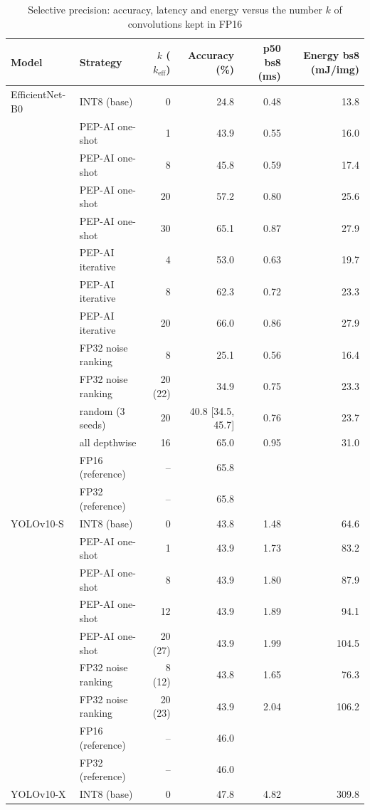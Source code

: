 \documentclass[pdflatex,sn-mathphys-num]{sn-jnl}%
\theoremstyle{thmstyleone}%
\theoremstyle{thmstyletwo}%
\theoremstyle{thmstylethree}%
\begin{document}
\begin{appendices}
\begin{table}[htbp]
\footnotesize\setlength{\tabcolsep}{2.5pt}
\caption{Selective precision: accuracy, latency and energy versus the number $k$ of convolutions kept in FP16}\label{tab:selective}
\begin{tabular}{@{}llrrrr@{}}
\toprule
Model & Strategy & $k$ ($k_\text{eff}$) & Accuracy (\%) & p50 bs8 (ms) & Energy bs8 (mJ/img) \\
\midrule
EfficientNet-B0 & INT8 (base) & 0 & 24.8 & 0.48 & 13.8 \\
 & PEP-AI one-shot & 1 & 43.9 & 0.55 & 16.0 \\
 & PEP-AI one-shot & 8 & 45.8 & 0.59 & 17.4 \\
 & PEP-AI one-shot & 20 & 57.2 & 0.80 & 25.6 \\
 & PEP-AI one-shot & 30 & 65.1 & 0.87 & 27.9 \\
 & PEP-AI iterative & 4 & 53.0 & 0.63 & 19.7 \\
 & PEP-AI iterative & 8 & 62.3 & 0.72 & 23.3 \\
 & PEP-AI iterative & 20 & 66.0 & 0.86 & 27.9 \\
 & FP32 noise ranking & 8 & 25.1 & 0.56 & 16.4 \\
 & FP32 noise ranking & 20 (22) & 34.9 & 0.75 & 23.3 \\
 & random (3 seeds) & 20 & 40.8 [34.5, 45.7] & 0.76 & 23.7 \\
 & all depthwise & 16 & 65.0 & 0.95 & 31.0 \\
 & FP16 (reference) & -- & 65.8 & & \\
 & FP32 (reference) & -- & 65.8 & & \\
\midrule
YOLOv10-S & INT8 (base) & 0 & 43.8 & 1.48 & 64.6 \\
 & PEP-AI one-shot & 1 & 43.9 & 1.73 & 83.2 \\
 & PEP-AI one-shot & 8 & 43.9 & 1.80 & 87.9 \\
 & PEP-AI one-shot & 12 & 43.9 & 1.89 & 94.1 \\
 & PEP-AI one-shot & 20 (27) & 43.9 & 1.99 & 104.5 \\
 & FP32 noise ranking & 8 (12) & 43.8 & 1.65 & 76.3 \\
 & FP32 noise ranking & 20 (23) & 43.9 & 2.04 & 106.2 \\
 & FP16 (reference) & -- & 46.0 & & \\
 & FP32 (reference) & -- & 46.0 & & \\
\midrule
YOLOv10-X & INT8 (base) & 0 & 47.8 & 4.82 & 309.8 \\

\end{tabular}
\end{table}
\end{appendices}
\end{document}
